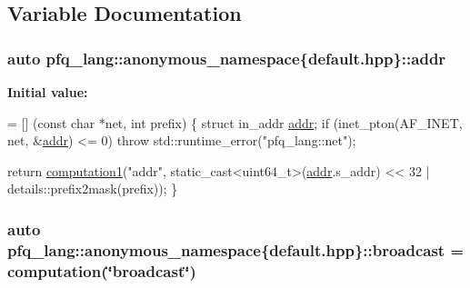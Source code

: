 \subsection{Variable Documentation}
\hypertarget{namespacepfq__lang_1_1anonymous__namespace_02default_8hpp_03_aafce8334d1be83bff9a2115439c8c453}{
\subsubsection[{addr}]{\setlength{\rightskip}{0pt plus 5cm}auto pfq\-\_\-lang\-::anonymous\-\_\-namespace\{default.\-hpp\}\-::addr}}\label{namespacepfq__lang_1_1anonymous__namespace_02default_8hpp_03_aafce8334d1be83bff9a2115439c8c453}
{\bfseries Initial value\-:}
\begin{DoxyCode}
= [] (\textcolor{keyword}{const} \textcolor{keywordtype}{char} *net, \textcolor{keywordtype}{int} prefix)
        \{
            \textcolor{keyword}{struct }in\_addr \hyperlink{namespacepfq__lang_1_1anonymous__namespace_02default_8hpp_03_aafce8334d1be83bff9a2115439c8c453}{addr};
            \textcolor{keywordflow}{if} (inet\_pton(AF\_INET, net, &\hyperlink{namespacepfq__lang_1_1anonymous__namespace_02default_8hpp_03_aafce8334d1be83bff9a2115439c8c453}{addr}) <= 0)
                \textcolor{keywordflow}{throw} std::runtime\_error(\textcolor{stringliteral}{"pfq\_lang::net"});

            \textcolor{keywordflow}{return} \hyperlink{namespacepfq__lang_a58e7e358fc7c95121f74d56c094b1627}{computation1}(\textcolor{stringliteral}{"addr"}, static\_cast<uint64\_t>(\hyperlink{namespacepfq__lang_1_1anonymous__namespace_02default_8hpp_03_aafce8334d1be83bff9a2115439c8c453}{addr}.s\_addr) << 32 | 
      details::prefix2mask(prefix));
        \}
\end{DoxyCode}
\hypertarget{namespacepfq__lang_1_1anonymous__namespace_02default_8hpp_03_a3b7dd001dfb2302c93212313c0bfa82a}{
\subsubsection[{broadcast}]{\setlength{\rightskip}{0pt plus 5cm}auto pfq\-\_\-lang\-::anonymous\-\_\-namespace\{default.\-hpp\}\-::broadcast = {\bf computation}(\char`\"{}broadcast\char`\"{})}}\label{namespacepfq__lang_1_1anonymous__namespace_02default_8hpp_03_a3b7dd001dfb2302c93212313c0bfa82a}
